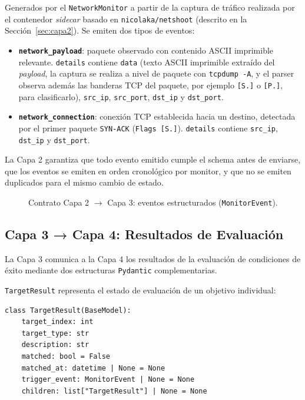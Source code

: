 Generados por el \texttt{NetworkMonitor} a partir de la captura de tráfico
realizada por el contenedor \textit{sidecar} basado en
\texttt{nicolaka/netshoot} (descrito en la Sección~\ref{sec:capa2}). Se emiten
dos tipos de eventos:

\begin{itemize}
    \item \textbf{\texttt{network\_payload}}: paquete observado con contenido
    ASCII imprimible relevante. \texttt{details} contiene \texttt{data} (texto
    ASCII imprimible extraído del \textit{payload}, la captura se realiza a
    nivel de paquete con \texttt{tcpdump -A}, y el parser observa además las
    banderas TCP del paquete, por ejemplo \texttt{[S.]} o \texttt{[P.]}, para
    clasificarlo),
    \texttt{src\_ip}, \texttt{src\_port}, \texttt{dst\_ip} y \texttt{dst\_port}.

    \item \textbf{\texttt{network\_connection}}: conexión TCP establecida hacia
    un destino, detectada por el primer paquete \texttt{SYN-ACK} (\texttt{Flags
    [S.]}). \texttt{details} contiene \texttt{src\_ip}, \texttt{dst\_ip} y
    \texttt{dst\_port}.
\end{itemize}

La Capa 2 garantiza que todo evento emitido cumple el schema antes de enviarse,
que los eventos se emiten en orden cronológico por monitor, y que no se emiten
duplicados para el mismo cambio de estado.

\begin{figure}[h]
    \centering
    \resizebox{\textwidth}{!}{}
    \caption{Contrato Capa 2 $\rightarrow$ Capa 3: eventos estructurados
    (\texttt{MonitorEvent}).}
    \label{fig:contrato-23}
\end{figure}

\subsection{Capa 3 → Capa 4: Resultados de Evaluación}

La Capa 3 comunica a la Capa 4 los resultados de la evaluación de condiciones de
éxito mediante dos estructuras \texttt{Pydantic} complementarias.

\texttt{TargetResult} representa el estado de evaluación de un objetivo
individual:

\begin{verbatim}
class TargetResult(BaseModel):
    target_index: int
    target_type: str
    description: str
    matched: bool = False
    matched_at: datetime | None = None
    trigger_event: MonitorEvent | None = None
    children: list["TargetResult"] | None = None
\end{verbatim}

